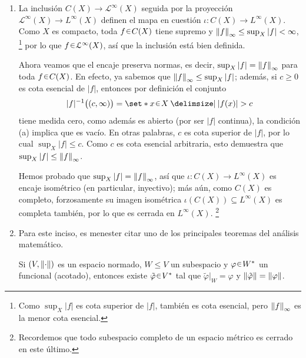 \begin{sol}
\begin{enumerate}[label = (\roman*), leftmargin=1.8em]
\item %
La inclusión $C(X) \to \mathcal{L}^{\infty}(X)$ seguida por la proyección $\mathcal{L}^\infty(X) \to L^\infty(X)$ definen el mapa en cuestión $\iota\colon C(X) \to L^\infty(X)$. Como $X$ es compacto, toda $f\en C(X)$ tiene supremo y $\norm{f}_\infty \leq \sup_X \abs{f} < \infty$,%
\footnote{
    Como $\sup_X|f|$ es cota superior de $|f|$, también es cota esencial, pero $\norm{f}_\infty$ es la menor cota esencial.
}
por lo que $f\en\mathcal{L}^\infty(X)$, así que la inclusión está bien definida.\par
Ahora veamos que el encaje preserva normas, es decir, $\sup_X|f| = \norm{f}_\infty$ para toda $f\en C(X)$. En efecto, ya sabemos que $\norm{f}_\infty \leq \sup_X \abs{f}$; además, si $c\ge0$ es cota esencial de $|f|$, entonces por definición el conjunto
\[
|f|^{-1}\bigl((c,\infty)\bigr) = \set*{x \en X \given |f(x)| > c}
\]
tiene medida cero, como además es abierto (por ser $|f|$ continua), la condición (a) implica que es vacío. En otras palabras, $c$ es cota superior de $|f|$, por lo cual $\sup_X |f| \leq c$. Como $c$ es cota esencial arbitraria, esto demuestra que $\sup_X|f| \leq \norm{f}_\infty$. \par
Hemos probado que $\sup_X|f| = \norm{f}_\infty$, así que $\iota\colon C(X) \to L^\infty(X)$ es encaje isométrico (en particular, inyectivo); más aún, como $C(X)$ es completo, forzosamente su imagen isométrica $\iota(C(X)) \subseteq L^\infty(X)$ es completa también, por lo que es cerrada en $L^\infty(X)$.%
\footnote{ 
    Recordemos que todo subespacio completo de un espacio métrico es cerrado en este último.
}\pagebreak[3]
\item %
Para este inciso, es menester citar uno de los principales teoremas del análisis matemático.
\begin{tcolorbox}[colback=white, boxrule=0.5pt, fontupper=\small,arc=0.5mm]
\begin{teo}\label{teo:HB}
Si $(V,\norm{\cdot})$ es un espacio normado, $W \leq V$ un subespacio y $\varphi\en W^*$ un funcional (acotado), entonces existe $\tilde{\varphi} \en V^*$ tal que $\tilde{\varphi}|_W = \varphi$ y $\norm{\tilde{\varphi}} = \norm{\varphi}$.
\end{teo}
\end{tcolorbox}\vspace{1em}

\end{enumerate}
\end{sol}
